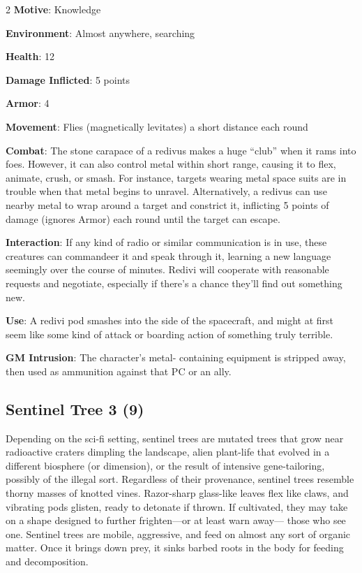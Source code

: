 \begin{multicols}{2}
\textbf{Motive}: Knowledge 

\textbf{Environment}: Almost anywhere, searching 

\textbf{Health}: 12 

\textbf{Damage Inflicted}: 5 points 

\textbf{Armor}: 4 

\textbf{Movement}: Flies (magnetically levitates) a short distance each round 

\textbf{Combat}: The stone carapace of a redivus makes a huge “club” when it rams into foes. However, it can also control metal within short range, causing it to flex, animate, crush, or smash. For instance, targets wearing metal space suits are in trouble when that metal begins to unravel. Alternatively, a redivus can use nearby metal to wrap around a target and constrict it, inflicting 5 points of damage (ignores Armor) each round until the target can escape. 

\textbf{Interaction}: If any kind of radio or similar communication is in use, these creatures can commandeer it and speak through it, learning a new language seemingly over the course of minutes. Redivi will cooperate with reasonable requests and negotiate, especially if there’s a chance they’ll find out something new. 

\textbf{Use}: A redivi pod smashes into the side of the spacecraft, and might at first seem like some kind of attack or boarding action of something truly terrible.

\textbf{GM Intrusion}: The character’s metal- containing equipment is stripped away, then used as ammunition against that PC or an ally.

\subsection{Sentinel Tree 3 (9)}

Depending on the sci-fi setting, sentinel trees are mutated trees that grow near radioactive craters dimpling the landscape, alien plant-life that evolved in a different biosphere (or dimension), or the result of intensive gene-tailoring, possibly of the illegal sort. Regardless of their provenance, sentinel trees resemble thorny masses of knotted vines. Razor-sharp glass-like leaves flex like claws, and vibrating pods glisten, ready to detonate if thrown. If cultivated, they may take on a shape designed to further frighten—or at least warn away— those who see one. Sentinel trees are mobile, aggressive, and feed on almost any sort of organic matter. Once it brings down prey, it sinks barbed roots in the body for feeding and decomposition. 


\end{multicols}
